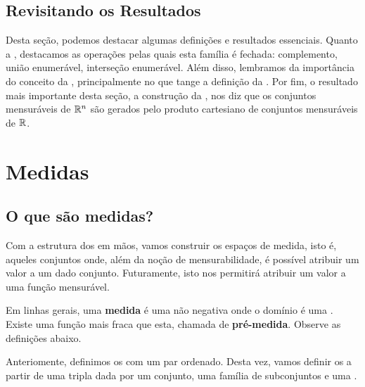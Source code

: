 \productSigmaAlgebraOfRn

\subsection*{Revisitando os Resultados}
Desta seção, podemos destacar algumas definições e resultados essenciais. Quanto a , destacamos as operações pelas quais esta família é fechada: complemento, união enumerável, interseção enumerável. Além disso, lembramos da importância do conceito da , principalmente no que tange a definição da . Por fim, o resultado mais importante desta seção, a construção da , nos diz que os conjuntos mensuráveis de $\mathbb{R}^n$ são gerados pelo produto cartesiano de conjuntos mensuráveis de $\mathbb{R}$.














\section{Medidas}

\subsection*{O que são medidas?}
Com a estrutura dos  em mãos, vamos construir os espaços de medida, isto é, aqueles conjuntos onde, além da noção de mensurabilidade, é possível atribuir um valor a um dado conjunto. Futuramente, isto nos permitirá atribuir um valor a uma função mensurável.

Em linhas gerais, uma \textbf{medida} é uma  não negativa onde o domínio é uma . Existe uma função mais fraca que esta, chamada de \textbf{pré-medida}. Observe as definições abaixo.

\preMeasure
\measure

Anteriomente, definimos os  com um par ordenado. Desta vez, vamos definir os  a partir de uma tripla dada por um conjunto, uma família de subconjuntos e uma .

